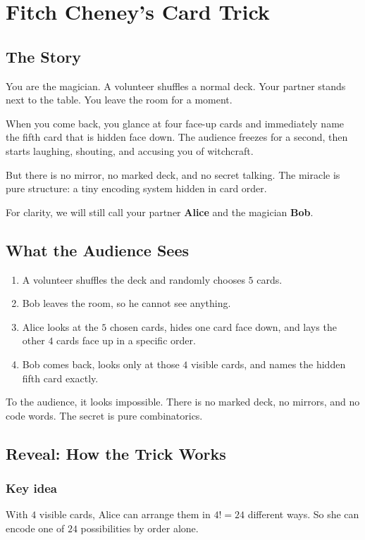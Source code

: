 \chapter{Fitch Cheney's Card Trick}

\section{The Story}
You are the magician. A volunteer shuffles a normal deck. Your partner stands
next to the table. You leave the room for a moment.

When you come back, you glance at four face-up cards and immediately name the
fifth card that is hidden face down. The audience freezes for a second, then
starts laughing, shouting, and accusing you of witchcraft.

But there is no mirror, no marked deck, and no secret talking. The miracle is
pure structure: a tiny encoding system hidden in card order.

For clarity, we will still call your partner \textbf{Alice} and the magician
\textbf{Bob}.

\section{What the Audience Sees}
\begin{enumerate}
  \item A volunteer shuffles the deck and randomly chooses \(5\) cards.
  \item Bob leaves the room, so he cannot see anything.
  \item Alice looks at the \(5\) chosen cards, hides one card face down, and
  lays the other \(4\) cards face up in a specific order.
  \item Bob comes back, looks only at those \(4\) visible cards, and names the
  hidden fifth card exactly.
\end{enumerate}

To the audience, it looks impossible. There is no marked deck, no mirrors, and
no code words. The secret is pure combinatorics.

\section{Reveal: How the Trick Works}
\subsection*{Key idea}
With \(4\) visible cards, Alice can arrange them in \(4! = 24\) different ways.
So she can encode one of \(24\) possibilities by order alone.

